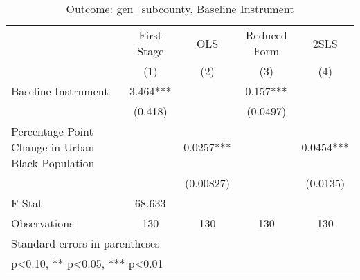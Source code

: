 \begin{table}[htbp]\centering
\def\sym#1{\ifmmode^{#1}\else\(^{#1}\)\fi}
\caption{Outcome: gen\_subcounty, Baseline Instrument}
\begin{tabular}{l*{4}{c}}
\toprule
                    & First Stage   &         OLS   &Reduced Form   &        2SLS   \\
                    &\multicolumn{1}{c}{(1)}   &\multicolumn{1}{c}{(2)}   &\multicolumn{1}{c}{(3)}   &\multicolumn{1}{c}{(4)}   \\
\midrule
Baseline Instrument &       3.464***&               &       0.157***&               \\
                    &     (0.418)   &               &    (0.0497)   &               \\
\addlinespace
Percentage Point Change in Urban Black Population&               &      0.0257***&               &      0.0454***\\
                    &               &   (0.00827)   &               &    (0.0135)   \\
\midrule
F-Stat              &      68.633   &               &               &               \\
Observations        &         130   &         130   &         130   &         130   \\
\bottomrule
\multicolumn{5}{l}{\footnotesize Standard errors in parentheses}\\
\multicolumn{5}{l}{\footnotesize * p<0.10, ** p<0.05, *** p<0.01}\\
\end{tabular}
\end{table}
